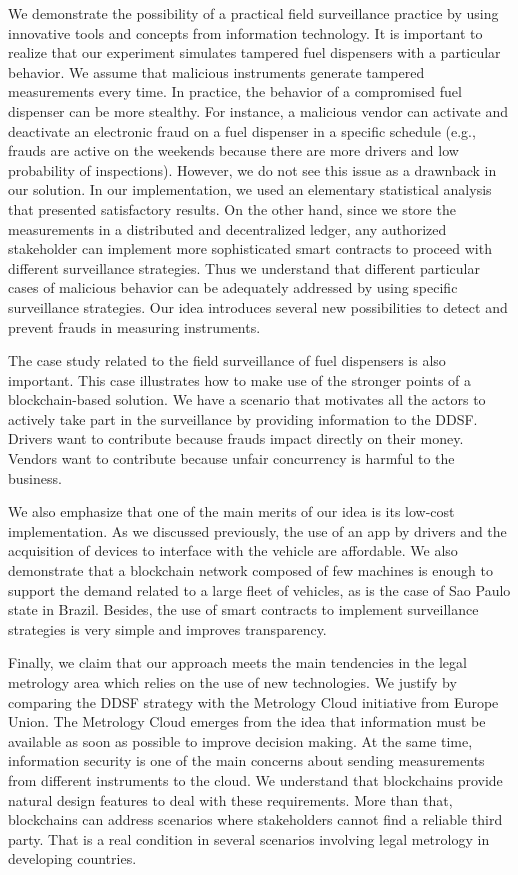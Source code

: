 \documentclass[sigplan]{acmart}
\begin{document}
We demonstrate the possibility of a practical field surveillance practice by using innovative tools and concepts from information technology.
It is important to realize that our experiment simulates tampered fuel dispensers with a particular behavior.
We assume that malicious instruments generate tampered measurements every time.
In practice, the behavior of a compromised fuel dispenser can be more stealthy.
For instance, a malicious vendor can activate and deactivate an electronic fraud on a fuel dispenser in a specific schedule (e.g., frauds are active on the weekends because there are more drivers and low probability of inspections).
However, we do not see this issue as a drawnback in our solution.
In our implementation, we used an elementary statistical analysis that presented satisfactory results.
On the other hand, since we store the measurements in a distributed and decentralized ledger, any authorized stakeholder can implement more sophisticated smart contracts to proceed with different surveillance strategies.
Thus we understand that different particular cases of malicious behavior can be adequately addressed by using specific surveillance strategies.
Our idea introduces several new possibilities to detect and prevent frauds in measuring instruments.

The case study related to the field surveillance of fuel dispensers is also important.
This case illustrates how to make use of the stronger points of a blockchain-based solution.
We have a scenario that motivates all the actors to actively take part in the surveillance by providing information to the DDSF.
Drivers want to contribute because frauds impact directly on their money.
Vendors want to contribute because unfair concurrency is harmful to the business.

We also emphasize that one of the main merits of our idea is its low-cost implementation.
As we discussed previously, the use of an app by drivers and the acquisition of devices to interface with the vehicle are affordable.
We also demonstrate that a blockchain network composed of few machines is enough to support the demand related to a large fleet of vehicles, as is the case of Sao Paulo state in Brazil.
Besides, the use of smart contracts to implement surveillance strategies is very simple and improves transparency.

Finally, we claim that our approach meets the main tendencies in the legal metrology area which relies on the use of new technologies.
We justify by comparing the DDSF strategy with the Metrology Cloud initiative from Europe Union.
The Metrology Cloud emerges from the idea that information must be available as soon as possible to improve decision making.
At the same time, information security is one of the main concerns about sending measurements from different instruments to the cloud.
We understand that blockchains provide natural design features to deal with these requirements.
More than that, blockchains can address scenarios where stakeholders cannot find a reliable third party.
That is a real condition in several scenarios involving legal metrology in developing countries.
\end{document}
